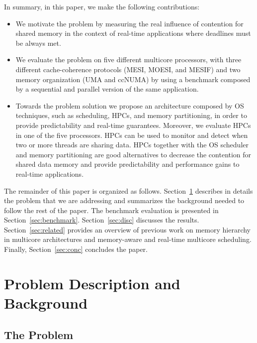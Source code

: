 \documentclass[conference]{IEEEtran}
\begin{document}
In summary, in this paper, we make the following contributions:

\begin{itemize}
	\item We motivate the problem by measuring the real influence of contention for shared memory in the context of real-time applications where deadlines must be always met.
	\item We evaluate the problem on five different multicore processors, with three different cache-coherence protocols (MESI, MOESI, and MESIF) and two memory organization (UMA and ccNUMA) by using a benchmark composed by a sequential and parallel version of the same application.
	\item Towards the problem solution we propose an architecture composed by OS techniques, such as scheduling, HPCs, and memory partitioning, in order to provide predictability and real-time guarantees. Moreover, we evaluate HPCs in one of the five processors. HPCs can be used to monitor and detect when two or more threads are sharing data. HPCs together with the OS scheduler and memory partitioning are good alternatives to decrease the contention for shared data memory and provide predictability and performance gains to real-time applications.
\end{itemize}

The remainder of this paper is organized as follows. Section~\ref{sec:back} describes in details the problem that we are addressing and summarizes the background needed to follow the rest of the paper. The benchmark evaluation is presented in Section~\ref{sec:benchmark}. Section~\ref{sec:disc} discusses the results. Section~\ref{sec:related} provides an overview of previous work on memory hierarchy in multicore architectures and memory-aware and real-time multicore scheduling. Finally, Section~\ref{sec:conc} concludes the paper.

\section{Problem Description and Background}
\label{sec:back}

\subsection{The Problem}
\end{document}
